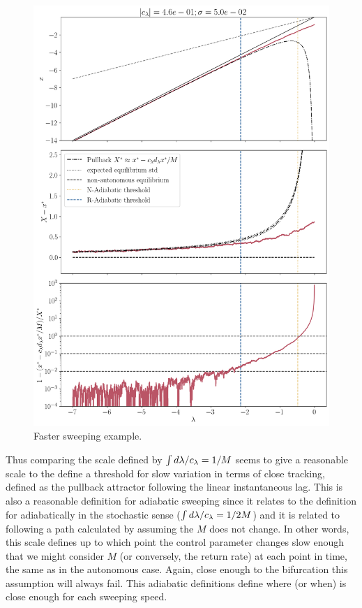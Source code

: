 \begin{figure}[htb]
	\centering
	\includegraphics[width=0.9\linewidth]{Images/Metrics/traking/adiab_rtip_def039}
	\caption{Faster sweeping example.}
	\label{fig:adiabrtipdef039}
\end{figure}

Thus comparing the scale defined by $\int d\lambda/c_\lambda =1/M$ seems to give a reasonable scale to the define a threshold for slow variation in terms of close tracking, defined as the pullback attractor following the linear instantaneous lag.
This is also a reasonable definition for adiabatic sweeping since it relates to the definition for adiabatically in the stochastic sense ($\int d\lambda/c_\lambda =1/2M$)
and it is related to following a path calculated by assuming the $M$ does not change. 
In other words, this scale defines up to which point the control parameter changes slow enough that we might consider $M$ (or conversely, the return rate) at each point in time, the same as in the autonomous case. 
Again, close enough to the bifurcation this assumption will always fail. This adiabatic definitions define where (or when) is close enough for each sweeping speed. 


